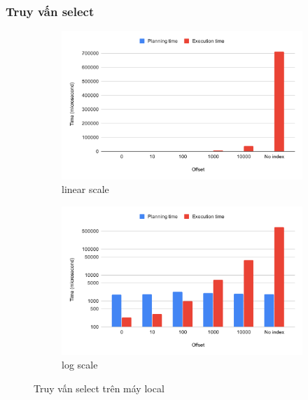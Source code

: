 \subsubsection{Truy vấn select}
\begin{figure}[H]
\centering
\begin{subfigure}{0.5\textwidth}
    \centering
    \includegraphics[width=\textwidth]{images/testing/select-local.png}
    \caption{linear scale}
\end{subfigure}%
\begin{subfigure}{0.5\textwidth}
    \centering
    \includegraphics[width=\textwidth]{images/testing/select-local-log.png}
    \caption{log scale}
\end{subfigure}
\caption{Truy vấn select trên máy local}
\end{figure}

